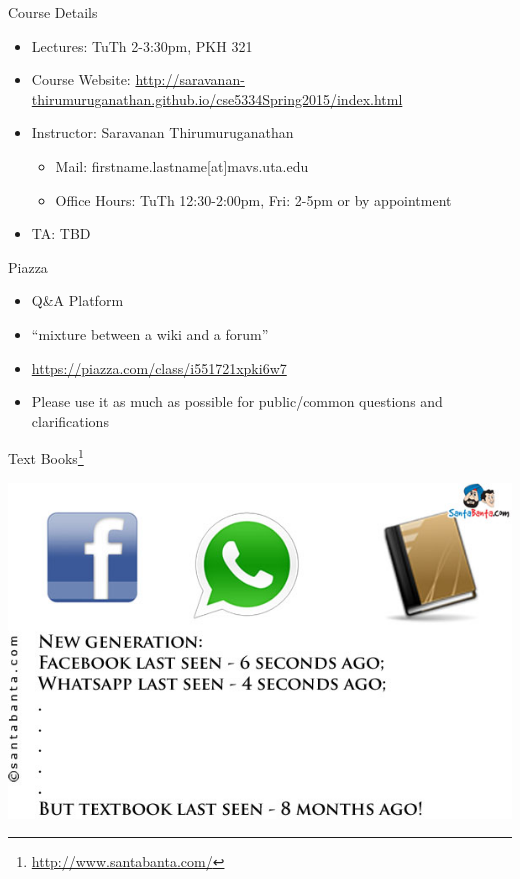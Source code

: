 \documentclass{beamer}
\begin{document}
\begin{frame}{Course Details}
    \begin{itemize}
        \item Lectures: TuTh 2-3:30pm, PKH 321
        \item Course Website: \url{http://saravanan-thirumuruganathan.github.io/cse5334Spring2015/index.html}
        \item Instructor: Saravanan Thirumuruganathan
        \begin{itemize}
            \item Mail: firstname.lastname[at]mavs.uta.edu
            \item Office Hours: TuTh 12:30-2:00pm, Fri: 2-5pm or by appointment 
        \end{itemize}
        \item TA: TBD
    \end{itemize}
\end{frame}


\begin{frame}{Piazza}
    \begin{itemize}
        \item Q\&A Platform
        \item ``mixture between a wiki and a forum''
        \item \url{https://piazza.com/class/i551721xpki6w7}
        \item Please use it as much as possible for public/common questions and clarifications
    \end{itemize}
\end{frame}

\begin{frame}{Text Books\footnote{\url{http://www.santabanta.com/}}}
    \begin{center}
        \includegraphics[scale=0.5]{santaBanta.jpg}
    \end{center}
\end{frame}
\end{document}
